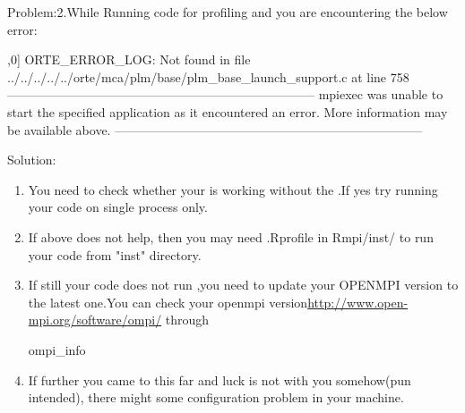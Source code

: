 {\color{red}Problem:2.}While Running  code for profiling and  you are encountering the below error:
\begin{Output}
[G:12221] [[39704,0],0] ORTE_ERROR_LOG: Not found in file ../../../../../orte/mca/plm/base/plm_base_launch_support.c at line 758
--------------------------------------------------------------------------
mpiexec was unable to start the specified application as it encountered an error.
More information may be available above.
--------------------------------------------------------------------------
\end{Output}
{\color{dkgreen}Solution:}
\begin{enumerate}
\item You need to check whether your  is working without the .If yes try running your  code on single process only.
\item If above does not help, then you may need .Rprofile in Rmpi/inst/ to run your code from "inst" directory.
\item If still your code does not run ,you need to update your OPENMPI version to the latest one.You can check your openmpi version\url{http://www.open-mpi.org/software/ompi/} through 
\begin{Output}
ompi_info
\end{Output}
\item If further you came to this far and luck is not with you somehow(pun intended), there might some configuration problem in your machine.
\end{enumerate}



